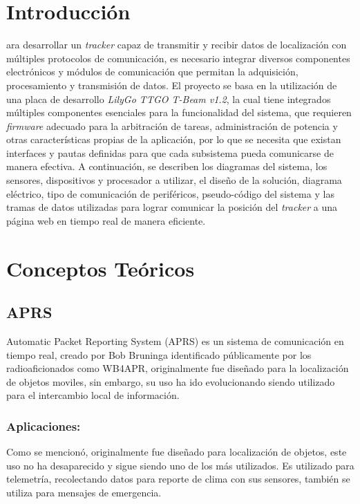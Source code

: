 \documentclass[journal]{IEEEtran}
\begin{document}
\section{Introducción}

ara desarrollar un \textit{tracker} capaz de transmitir y recibir datos de localización con múltiples protocolos de comunicación, es necesario integrar diversos componentes electrónicos y módulos de comunicación que permitan la adquisición, procesamiento y transmisión de datos. El proyecto se basa en la utilización de una placa de desarrollo \textit{LilyGo TTGO T-Beam v1.2}, la cual tiene integrados múltiples componentes esenciales para la funcionalidad del sistema, que requieren \textit{firmware} adecuado para la arbitración de tareas, administración de potencia y otras características propias de la aplicación, por lo que se necesita que existan interfaces y pautas definidas para que cada subsistema pueda comunicarse de manera efectiva. A continuación, se describen los diagramas del sistema, los sensores, dispositivos y procesador a utilizar, el diseño de la solución, diagrama eléctrico, tipo de comunicación de periféricos, pseudo-código del sistema y las tramas de datos utilizadas para lograr comunicar la posición del \textit{tracker} a una página web en tiempo real de manera eficiente.

\section{Conceptos Teóricos}

\subsection{APRS}

Automatic Packet Reporting System (APRS) es un sistema de comunicación en tiempo real, creado por Bob Bruninga identificado públicamente por los radioaficionados como WB4APR, originalmente fue diseñado para la localización de objetos moviles, sin embargo, su uso ha ido evolucionando siendo utilizado para el intercambio local de información. \cite{ford2008arrl}

\subsubsection{Aplicaciones:}

Como se mencionó, originalmente fue diseñado para localización de objetos, este uso no ha desaparecido y sigue siendo uno de los más utilizados. Es utilizado para telemetría, recolectando datos para reporte de clima con sus sensores, también se utiliza para mensajes de emergencia. \cite{hamradioprep_aprs_nodate}
\end{document}
